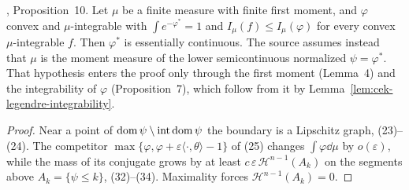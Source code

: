 \begin{proposition}
  \label{prop:cek-essential-continuity}
  \leanok
  \cite{CorderoKlartag2015}, Proposition~10. Let $\mu$ be a finite measure with finite first moment, and $\varphi$ convex
  and $\mu$-integrable with $\int e^{-\varphi^*}=1$ and $I_\mu(f)\le I_\mu(\varphi)$ for every convex $\mu$-integrable
  $f$. Then $\varphi^*$ is essentially continuous. The source assumes instead that $\mu$ is the moment measure of the
  lower semicontinuous normalized $\psi=\varphi^*$. That hypothesis enters the proof only through the first moment
  (Lemma~4) and the integrability of $\varphi$ (Proposition~7), which follow from it by
  Lemma~\ref{lem:cek-legendre-integrability}.
\end{proposition}
\begin{proof}
  \leanok
  Near a point of $\operatorname{dom}\psi\setminus\operatorname{int}\operatorname{dom}\psi$ the boundary is a Lipschitz graph, (23)--(24). The
  competitor $\max\{\varphi,\varphi+\varepsilon\langle\cdot,\theta\rangle-1\}$ of (25) changes $\int\varphi\dd\mu$ by
  $o(\varepsilon)$, while the mass of its conjugate grows by at least $c\,\varepsilon\,\mathcal H^{n-1}(A_k)$ on the
  segments above $A_k=\{\psi\le k\}$, (32)--(34). Maximality forces $\mathcal H^{n-1}(A_k)=0$.
\end{proof}

